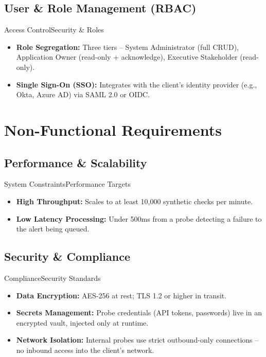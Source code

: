 \documentclass[11pt,a4paper]{article}
\begin{document}
\subsection{User \& Role Management (RBAC)}
\begin{recbox}{Access Control}{Security \& Roles}
\begin{itemize}
  \item \textbf{Role Segregation:} Three tiers -- System Administrator (full CRUD), Application Owner (read-only + acknowledge), Executive Stakeholder (read-only).
  \item \textbf{Single Sign-On (SSO):} Integrates with the client's identity provider (e.g., Okta, Azure AD) via SAML 2.0 or OIDC.
\end{itemize}
\end{recbox}


\section{Non-Functional Requirements}

\subsection{Performance \& Scalability}
\begin{issuebox}{System Constraints}{Performance Targets}
\begin{itemize}
  \item \textbf{High Throughput:} Scales to at least 10,000 synthetic checks per minute.
  \item \textbf{Low Latency Processing:} Under 500ms from a probe detecting a failure to the alert being queued.
\end{itemize}
\end{issuebox}

\subsection{Security \& Compliance}
\begin{issuebox}{Compliance}{Security Standards}
\begin{itemize}
  \item \textbf{Data Encryption:} AES-256 at rest; TLS 1.2 or higher in transit.
  \item \textbf{Secrets Management:} Probe credentials (API tokens, passwords) live in an encrypted vault, injected only at runtime.
  \item \textbf{Network Isolation:} Internal probes use strict outbound-only connections -- no inbound access into the client's network.
\end{itemize}
\end{issuebox}
\end{document}
